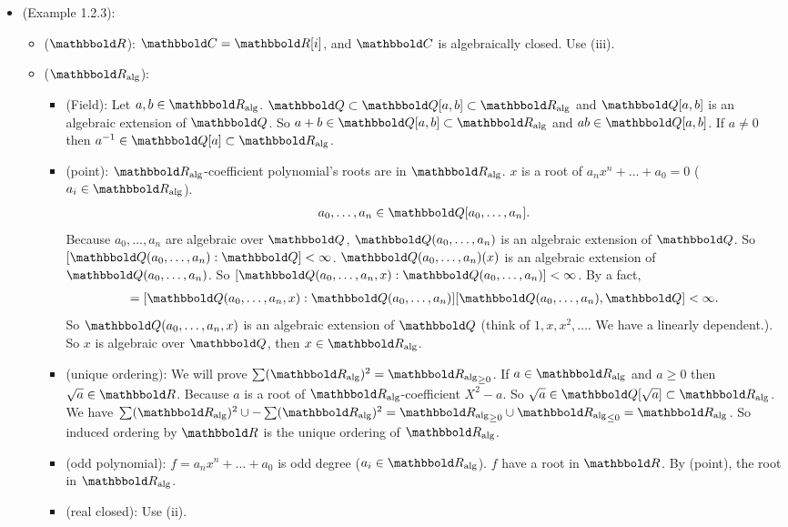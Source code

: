 \documentclass[9pt]{ltjsarticle}
\begin{document}
\begin{itemize}
\begin{itemize}
\begin{itemize}
    \end{itemize}
  \end{itemize}
  \item
  (Example 1.2.3):
  \begin{itemize}
    \item ($\R$):
    $\C = \R [i]$, and $\C$ is algebraically closed.  Use (iii).
    \item ($\R_{\alg}$):
    \begin{itemize}
      \item (Field):
      Let $a,b\in \R_\alg$.
      $\Q \subset \Q [a,b] \subset \R_{\alg}$ and $\Q [a,b]$ is
      an algebraic extension of $\Q$.
      So $a+b \in \Q [a,b] \subset \R_{\alg}$ and $ab \in \Q [a,b]$.
      If $a \neq 0$ then $a\inv \in \Q [a] \subset \R_\alg$.
      \item (point):
      $\R_\alg$-coefficient polynomial's roots are in $\R_\alg$.
      \pf
      $x$ is a root of $a_n x^n + \dots + a_0 = 0$ ($a_i \in \R_\alg$).
      \begin{align}
        a_0,\dots,a_n \in \Q [a_0,\dots,a_n].
      \end{align}
      Because $a_0,\dots,a_n$ are algebraic over $\Q$,
      $\Q (a_0,\dots,a_n)$ is an algebraic extension of $\Q$.
      So $[\Q (a_0,\dots,a_n): \Q] < \infty$.
      $\Q (a_0,\dots,a_n)(x)$ is an algebraic extension of $\Q (a_0,\dots,a_n)$.
      So $[\Q (a_0,\dots,a_n,x):\Q (a_0,\dots,a_n)]<\infty$.
      By a fact,
      \begin{align}
        [\Q (a_0,\dots,a_n,x):\Q] = [\Q (a_0,\dots,a_n,x):\Q (a_0,\dots,a_n)] [\Q (a_0,\dots,a_n),\Q] < \infty.
      \end{align}
      So $\Q (a_0,\dots,a_n,x)$ is an algebraic extension of $\Q$ (think of $1,x,x^2,\dots$.  We have a linearly dependent.).
      So $x$ is algebraic over $\Q$, then $x \in \R_\alg$.
      \item (unique ordering):
      We will prove $\sum (\R_\alg)^2 = {\R_\alg}_{\ge 0}$.
      If $a \in \R_\alg$ and $a \ge 0$ then $\sqrt{a} \in \R$.
      Because $a$ is a root of $\R_\alg$-coefficient $X^2 -a$.
      So $\sqrt{a} \in \Q [\sqrt{a}] \subset \R_\alg$.
      We have $\sum (\R_\alg)^2 \cup -\sum (\R_\alg)^2 = {\R_\alg}_{\ge 0}\cup {\R_\alg}_{\le 0} = \R_\alg$.
      So induced ordering by $\R$ is the unique ordering of $\R_\alg$.
      \item (odd polynomial):
      $f = a_n x^n + \dots + a_0$ is odd degree ($a_i \in \R_\alg$).
      $f$ have a root in $\R$.  By (point), the root in $\R_\alg$.
      \item (real closed):
      Use (ii).
    \end{itemize}


\end{itemize}
\end{itemize}
\end{document}
